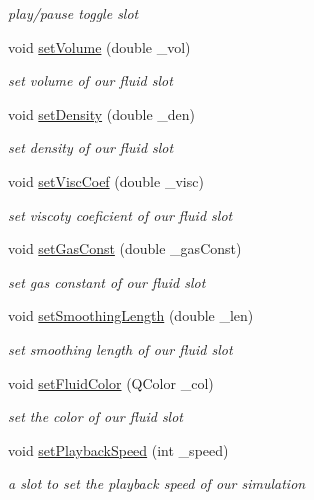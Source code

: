 \begin{DoxyCompactItemize}
\begin{DoxyCompactList}\small\item\em play/pause toggle slot \end{DoxyCompactList}\item 
void \hyperlink{class_open_g_l_widget_a4f9cc5b8135515ea87870585dfdf194b}{set\-Volume} (double \-\_\-vol)
\begin{DoxyCompactList}\small\item\em set volume of our fluid slot \end{DoxyCompactList}\item 
void \hyperlink{class_open_g_l_widget_a2b1f58185ccc07782cc8c1d6f8f73863}{set\-Density} (double \-\_\-den)
\begin{DoxyCompactList}\small\item\em set density of our fluid slot \end{DoxyCompactList}\item 
void \hyperlink{class_open_g_l_widget_a2476342258d25fafecb7e784373141e4}{set\-Visc\-Coef} (double \-\_\-visc)
\begin{DoxyCompactList}\small\item\em set viscoty coeficient of our fluid slot \end{DoxyCompactList}\item 
void \hyperlink{class_open_g_l_widget_a5e4e0ff0bd8f6fad5fd1fb53265dc814}{set\-Gas\-Const} (double \-\_\-gas\-Const)
\begin{DoxyCompactList}\small\item\em set gas constant of our fluid slot \end{DoxyCompactList}\item 
void \hyperlink{class_open_g_l_widget_a0806c995ed218e055cab1f9c177a6818}{set\-Smoothing\-Length} (double \-\_\-len)
\begin{DoxyCompactList}\small\item\em set smoothing length of our fluid slot \end{DoxyCompactList}\item 
\hypertarget{class_open_g_l_widget_aba6ed78cded62034694d981d1e2e2219}{void \hyperlink{class_open_g_l_widget_aba6ed78cded62034694d981d1e2e2219}{set\-Fluid\-Color} (Q\-Color \-\_\-col)}\label{class_open_g_l_widget_aba6ed78cded62034694d981d1e2e2219}

\begin{DoxyCompactList}\small\item\em set the color of our fluid slot \end{DoxyCompactList}\item 
void \hyperlink{class_open_g_l_widget_a1ecbdc2f18d7b955d7827c7314aea5a9}{set\-Playback\-Speed} (int \-\_\-speed)
\begin{DoxyCompactList}\small\item\em a slot to set the playback speed of our simulation \end{DoxyCompactList}\end{DoxyCompactItemize}
